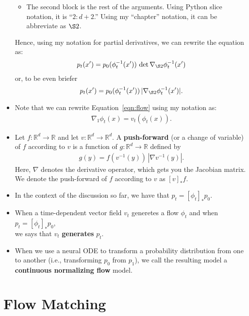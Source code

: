 \documentclass[10pt]{article}
\newcommand{\ra}{\rightarrow}
\newcommand{\Real}{\mathbb{R}}
\begin{document}
\begin{itemize}
\begin{itemize}
    \item The second block is the rest of the arguments. Using Python slice notation, it is ``$2:d+2$.'' Using my ``chapter'' notation, it can be abbreviate as $\S 2$.
  \end{itemize}
  Hence, using my notation for partial derivatives, we can rewrite the equation as:
  \begin{align*}
    p_t(x') = p_0(\phi_t^{-1}(x'))\, \det \nabla_{\S 2} \phi^{-1}_t(x')
  \end{align*}
  or, to be even briefer
  \begin{align}
    p_t(x') = p_0(\phi_t^{-1}(x'))\, | \nabla_{\S 2} \phi^{-1}_t(x') |. \label{eqn:cnf-prob-xform-my-notation}
  \end{align}

  \item Note that we can rewrite Equation~\eqref{eqn:flow} using my notation as:
  \begin{align}
    \nabla_1 \phi_t(x) = v_t(\phi_t(x)). \label{eqn:flow-my-notation}
  \end{align}

  \item Let $f: \Real^d \ra \Real$ and let $v: \Real^d \ra \Real^d$. A {\bf push-forward} (or a change of variable) of $f$ according to $v$ is a function of $g:\Real^d \ra \Real$ defined by
  \begin{align*}
    g(y) = f(v^{-1}(y))\, |\nabla v^{-1}(y)|. 
  \end{align*}
  Here, $\nabla$ denotes the derivative operator, which gets you the Jacobian matrix. We denote the push-forward of $f$ according to $v$ as $[v]_* f$.

  \item In the context of the discussion so far, we have that $p_t = [\phi_t]_* p_0$.
  
  \item When a time-dependent vector field $v_t$ generetes a flow $\phi_t$ and when $p_t = [\phi_t]_* p_0$,\\ we says that $v_t$ {\bf generates} $p_t$.
  
  \item When we use a neural ODE to transform a probability distribution from one to another (i.e., transforming $p_0$ from $p_1$), we call the resulting model a {\bf continuous normalizing flow} model. 
\end{itemize}

\section{Flow Matching}
\end{document}
